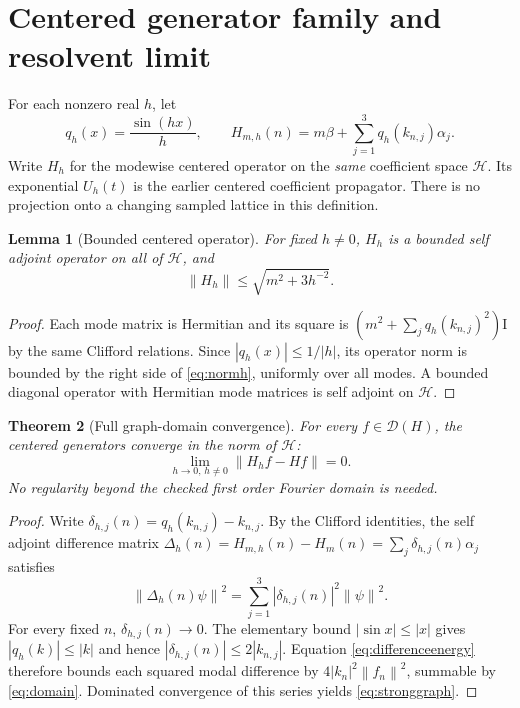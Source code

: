 \documentclass[11pt,oneside]{article}
\theoremstyle{kol}
\newtheorem{theorem}{Theorem}[section]
\newtheorem{lemma}[theorem]{Lemma}
\theoremstyle{definition}
\newcommand{\Hu}{\mathcal H}
\newcommand{\Dn}{\mathcal D}
\newcommand{\Id}{\mathrm I}
\newcommand{\pp}[1]{\left\lVert#1\right\rVert}
\begin{document}
\section{Centered generator family and resolvent limit}
For each nonzero real $h$, let
\begin{equation}\label{eq:q}
q_h(x)=\frac{\sin(hx)}h,
\qquad H_{m,h}(n)=m\beta+\sum_{j=1}^3q_h(k_{n,j})\alpha_j.
\end{equation}
Write $H_h$ for the modewise centered operator on the \emph{same} coefficient space $\Hu$. Its exponential $U_h(t)$ is the earlier centered coefficient propagator. There is no projection onto a changing sampled lattice in this definition.

\begin{lemma}[Bounded centered operator]\label{lem:bounded}
For fixed $h\ne0$, $H_h$ is a bounded self adjoint operator on all of $\Hu$, and
\begin{equation}\label{eq:normh}
\pp{H_h}\le\sqrt{m^2+3h^{-2}}.
\end{equation}
\end{lemma}
\begin{proof}
Each mode matrix is Hermitian and its square is $(m^2+\sum_jq_h(k_{n,j})^2)\Id$ by the same Clifford relations. Since $|q_h(x)|\le1/|h|$, its operator norm is bounded by the right side of \eqref{eq:normh}, uniformly over all modes. A bounded diagonal operator with Hermitian mode matrices is self adjoint on $\Hu$.
\end{proof}

\begin{theorem}[Full graph-domain convergence]\label{thm:graphconv}
For every $f\in\Dn(H)$, the centered generators converge in the norm of $\Hu$:
\begin{equation}\label{eq:stronggraph}
\lim_{h\to0,\,h\ne0}\pp{H_hf-Hf}=0.
\end{equation}
No regularity beyond the checked first order Fourier domain is needed.
\end{theorem}
\begin{proof}
Write $\delta_{h,j}(n)=q_h(k_{n,j})-k_{n,j}$. By the Clifford identities, the self adjoint difference matrix $\Delta_h(n)=H_{m,h}(n)-H_m(n)=\sum_j\delta_{h,j}(n)\alpha_j$ satisfies
\begin{equation}\label{eq:differenceenergy}
\pp{\Delta_h(n)\psi}^2=\sum_{j=1}^3|\delta_{h,j}(n)|^2\pp{\psi}^2.
\end{equation}
For every fixed $n$, $\delta_{h,j}(n)\to0$. The elementary bound $|\sin x|\le|x|$ gives $|q_h(k)|\le|k|$ and hence $|\delta_{h,j}(n)|\le2|k_{n,j}|$. Equation \eqref{eq:differenceenergy} therefore bounds each squared modal difference by $4|k_n|^2\pp{f_n}^2$, summable by \eqref{eq:domain}. Dominated convergence of this series yields \eqref{eq:stronggraph}.
\end{proof}
\end{document}
